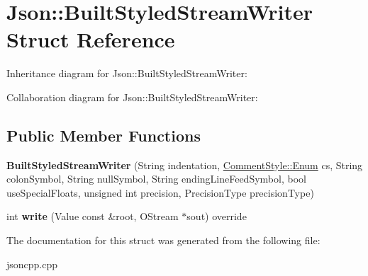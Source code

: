 \hypertarget{structJson_1_1BuiltStyledStreamWriter}{}\section{Json\+:\+:Built\+Styled\+Stream\+Writer Struct Reference}
\label{structJson_1_1BuiltStyledStreamWriter}


Inheritance diagram for Json\+:\+:Built\+Styled\+Stream\+Writer\+:


Collaboration diagram for Json\+:\+:Built\+Styled\+Stream\+Writer\+:
\subsection*{Public Member Functions}
\begin{DoxyCompactItemize}
\item 
\mbox{\label{structJson_1_1BuiltStyledStreamWriter_a92272cba2cf09a364f70c82a1fc0a64e}} 
{\bfseries Built\+Styled\+Stream\+Writer} (String indentation, \hyperlink{structJson_1_1CommentStyle_a51fc08f3518fd81eba12f340d19a3d0c}{Comment\+Style\+::\+Enum} cs, String colon\+Symbol, String null\+Symbol, String ending\+Line\+Feed\+Symbol, bool use\+Special\+Floats, unsigned int precision, Precision\+Type precision\+Type)
\item 
\mbox{\label{structJson_1_1BuiltStyledStreamWriter_ae50be640f3d53d885fa262d8d15e1ac7}} 
int {\bfseries write} (Value const \&root, O\+Stream $\ast$sout) override
\end{DoxyCompactItemize}


The documentation for this struct was generated from the following file\+:\begin{DoxyCompactItemize}
\item 
jsoncpp.\+cpp\end{DoxyCompactItemize}
